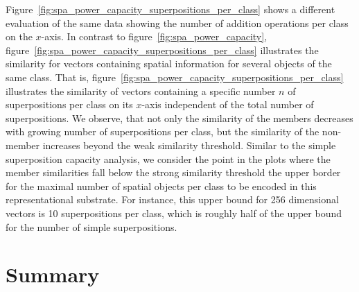 Figure~\ref{fig:spa_power_capacity_superpositions_per_class} shows a different evaluation of the same data showing the number of addition operations per class on the $x$-axis.
In contrast to figure~\ref{fig:spa_power_capacity}, figure~\ref{fig:spa_power_capacity_superpositions_per_class} illustrates the similarity for vectors containing spatial information for several objects of the same class.
That is, figure~\ref{fig:spa_power_capacity_superpositions_per_class} illustrates the similarity of vectors containing a specific number $n$ of superpositions per class on its $x$-axis independent of the total number of superpositions.
We observe, that not only the similarity of the members decreases with growing number of superpositions per class, but the similarity of the non-member increases beyond the weak similarity threshold.
Similar to the simple superposition capacity analysis, we consider the point in the plots where the member similarities fall below the strong similarity threshold the upper border for the maximal number of spatial objects per class to be encoded in this representational substrate.
For instance, this upper bound for \num{256} dimensional vectors is \num{10} superpositions per class, which is roughly half of the upper bound for the number of simple superpositions.

\section{Summary}%
\label{sec:vector_representations_automotive_summary}

